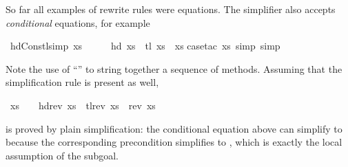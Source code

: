 \begin{isabelle}%
%
\begin{isamarkuptext}%
So far all examples of rewrite rules were equations. The simplifier also
accepts \emph{conditional} equations, for example%
\end{isamarkuptext}%
\ hd{\isacharunderscore}Cons{\isacharunderscore}tl{\isacharbrackleft}simp{\isacharbrackright}{\isacharcolon}\ {\isachardoublequote}xs\ {\isasymnoteq}\ {\isacharbrackleft}{\isacharbrackright}\ \ {\isasymLongrightarrow}\ \ hd\ xs\ {\isacharhash}\ tl\ xs\ {\isacharequal}\ xs{\isachardoublequote}\isanewline
{}case{\isacharunderscore}tac\ xs{\isacharcomma}\ simp{\isacharcomma}\ simp{\isacharparenright}%
\begin{isamarkuptext}%
\noindent
Note the use of ``'' to string together a
sequence of methods. Assuming that the simplification rule
is present as well,%
\end{isamarkuptext}%
\ {\isachardoublequote}xs\ {\isasymnoteq}\ {\isacharbrackleft}{\isacharbrackright}\ {\isasymLongrightarrow}\ hd{\isacharparenleft}rev\ xs{\isacharparenright}\ {\isacharhash}\ tl{\isacharparenleft}rev\ xs{\isacharparenright}\ {\isacharequal}\ rev\ xs{\isachardoublequote}%
\begin{isamarkuptext}%
\noindent
is proved by plain simplification:
the conditional equation  above
can simplify  to 
because the corresponding precondition 
simplifies to , which is exactly the local
assumption of the subgoal.%
\end{isamarkuptext}%
\end{isabelle}%
